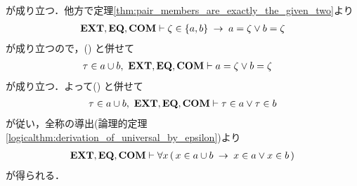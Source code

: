 \begin{sketch}
\begin{description}
				が成り立つ．他方で定理\ref{thm:pair_members_are_exactly_the_given_two}より
				\begin{align}
					\mbox{{\bf EXT}},\mbox{{\bf EQ}},\mbox{\bf COM} \vdash
					\zeta \in \{a,b\} \hspace{0.25em}\rightarrow\hspace{0.25em} a = \zeta \vee b = \zeta
				\end{align}
				が成り立つので，()
				と併せて
				\begin{align}
					\tau \in a \cup b,\ \mbox{{\bf EXT}},\mbox{{\bf EQ}},\mbox{\bf COM} &\vdash 
					a = \zeta \vee b = \zeta
				\end{align}
				が成り立つ．よって()
				と併せて
				\begin{align}
					\tau \in a \cup b,\ \mbox{{\bf EXT}},\mbox{{\bf EQ}},\mbox{\bf COM} \vdash 
					\tau \in a \vee \tau \in b
				\end{align}
				が従い，全称の導出(論理的定理\ref{logicalthm:derivation_of_universal_by_epsilon})より
				\begin{align}
					\mbox{{\bf EXT}},\mbox{{\bf EQ}},\mbox{\bf COM} \vdash 
					\forall x\, (\, x \in a \cup b \hspace{0.25em}\rightarrow\hspace{0.25em} x \in a \vee x \in b\, )
				\end{align}
				が得られる．
				

\end{description}
\end{sketch}
